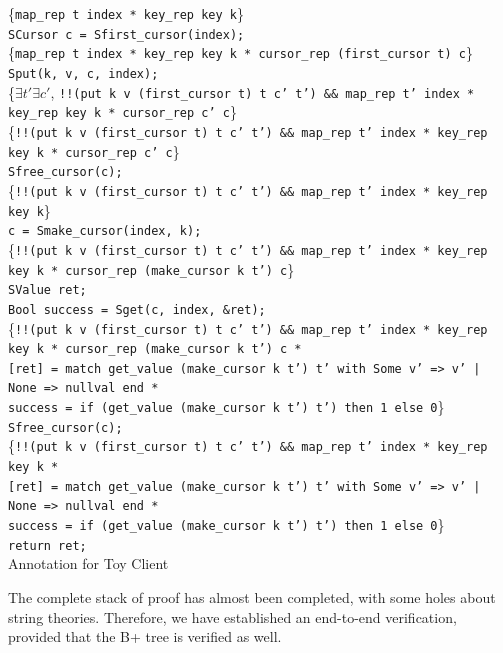 \documentclass[runningheads]{llncs}
\begin{document}
\begin{listing}[htbp]
\centering
\{\texttt{map\_rep t index * key\_rep key k}\} \\
\texttt{SCursor c = Sfirst\_cursor(index);} \\
\{\texttt{map\_rep t index * key\_rep key k * cursor\_rep (first\_cursor t)
c}\} \\
\texttt{Sput(k, v, c, index);} \\
\{$\exists t'\exists c'$, \texttt{!!(put k v (first\_cursor t) t c' t') \&\& map\_rep
t' index * key\_rep key k * cursor\_rep c' c}\} \\
\{\texttt{!!(put k v (first\_cursor t) t c' t') \&\& map\_rep t' index * key\_rep key
k * cursor\_rep c' c}\} \\
\texttt{Sfree\_cursor(c);} \\
\{\texttt{!!(put k v (first\_cursor t) t c' t') \&\& map\_rep t' index * key\_rep key
k}\} \\
\texttt{c = Smake\_cursor(index, k);} \\
\{\texttt{!!(put k v (first\_cursor t) t c' t') \&\& map\_rep t' index * key\_rep key
k * cursor\_rep (make\_cursor k t') c}\} \\
\texttt{SValue ret;} \\
\texttt{Bool success = Sget(c, index, \&ret);} \\
\{\texttt{!!(put k v (first\_cursor t) t c' t') \&\& map\_rep t' index * key\_rep key
k * cursor\_rep (make\_cursor k t') c *} \\
\texttt{[ret] = match get\_value (make\_cursor k t') t' with Some v' => v' | None =>
nullval end *} \\
\texttt{success = if (get\_value (make\_cursor k t') t') then 1 else 0}\} \\
\texttt{Sfree\_cursor(c);} \\
\{\texttt{!!(put k v (first\_cursor t) t c' t') \&\& map\_rep t' index * key\_rep key
k *} \\
\texttt{[ret] = match get\_value (make\_cursor k t') t' with Some v' => v' | None =>
nullval end *} \\
\texttt{success = if (get\_value (make\_cursor k t') t') then 1 else 0}\} \\
\texttt{return ret;} \\
\caption{Annotation for Toy Client}\label{lst:annotation}
\end{listing}

The complete stack of proof has almost been completed, with some holes about
string theories. Therefore, we have established an end-to-end verification,
provided that the B+ tree is verified as well.
\end{document}
